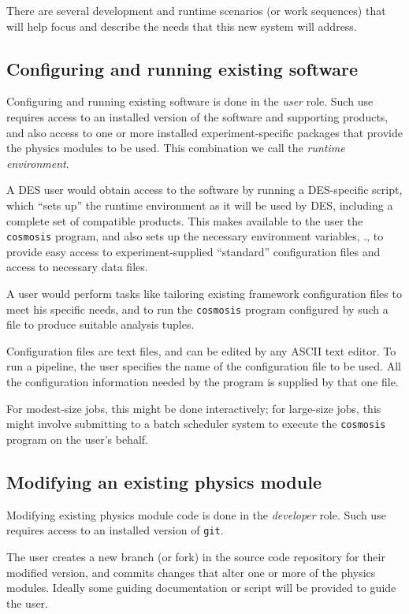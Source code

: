 \documentclass[draftmode,draftwater]{memarticle}
\newcommand{\prog}[1]%
  {\texttt{#1}}
\newcommand{\cosmosis}{\name{CosmoSIS}\xspace}
\begin{document}
There are several development and runtime scenarios (or work sequences)
that will help focus and describe the needs that this new system will
address.

\subsection{Configuring and running existing software}

Configuring and running existing software is done in the \emph{user}
role. Such use requires access to an installed version of the \cosmosis
software and supporting products, and also access to one or more
installed experiment-specific packages that provide the physics modules
to be used. This combination we call the \emph{runtime environment}.

A DES user would obtain access to the software by running a
DES-specific script, which ``sets up'' the runtime environment as
it will be used by DES, including a complete set of compatible products.
This makes available to the user the \prog{cosmosis} program, and also
sets up the necessary environment variables, \etc., to provide easy
access to experiment-supplied ``standard'' configuration files and
access to necessary data files.

A user would perform tasks like tailoring existing framework
configuration files to meet his specific needs, and to run the
\prog{cosmosis} program configured by such a file to produce suitable analysis
tuples.

Configuration files are text files, and can be edited by any ASCII text
editor. To run a pipeline, the user specifies the name of the
configuration file to be used. All the configuration information needed
by the program is supplied by that one file.

 For modest-size jobs, this might be done
interactively; for large-size jobs, this might involve submitting to
a batch scheduler system to execute the \prog{cosmosis} program on the user's behalf.

\subsection{Modifying an existing physics module}

Modifying existing physics module code is done in the
\emph{developer} role. Such use requires access to an
installed version of \prog{git}.

The user creates a new branch (or fork) in the source code repository
for their modified version, and
commits changes that alter one or more of the physics modules.
Ideally some guiding documentation or script will be provided to guide
the user.
\end{document}
